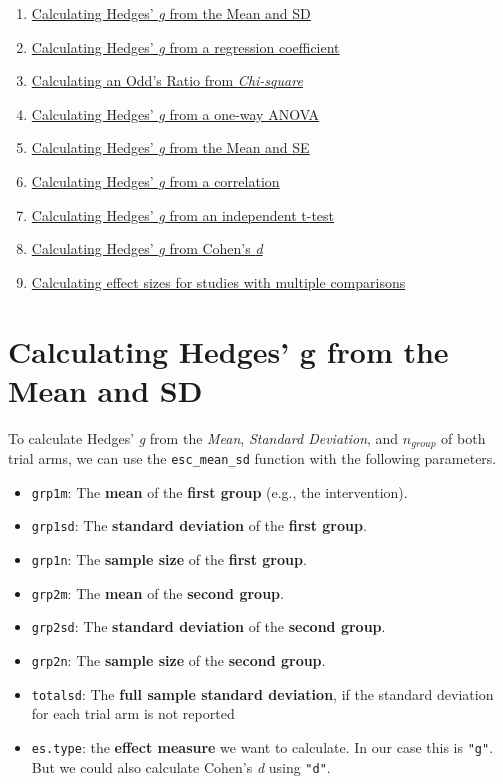 \documentclass[]{book}
\providecommand{\tightlist}{%
  \setlength{\itemsep}{0pt}\setlength{\parskip}{0pt}}
\begin{document}
\begin{enumerate}
\def\labelenumi{\arabic{enumi}.}
\tightlist
\item
  \protect\hyperlink{a}{Calculating Hedges' \emph{g} from the Mean and SD}
\item
  \protect\hyperlink{b}{Calculating Hedges' \emph{g} from a regression coefficient}
\item
  \protect\hyperlink{c}{Calculating an Odd's Ratio from \emph{Chi-square}}
\item
  \protect\hyperlink{d}{Calculating Hedges' \emph{g} from a one-way ANOVA}
\item
  \protect\hyperlink{e}{Calculating Hedges' \emph{g} from the Mean and SE}
\item
  \protect\hyperlink{f}{Calculating Hedges' \emph{g} from a correlation}
\item
  \protect\hyperlink{g}{Calculating Hedges' \emph{g} from an independent t-test}
\item
  \protect\hyperlink{h}{Calculating Hedges' \emph{g} from Cohen's \emph{d}}
\item
  \protect\hyperlink{i}{Calculating effect sizes for studies with multiple comparisons}
\end{enumerate}

\hypertarget{a}{%
\section{Calculating Hedges' g from the Mean and SD}\label{a}}

To calculate Hedges' \emph{g} from the \emph{Mean}, \emph{Standard Deviation}, and \(n_{group}\) of both trial arms, we can use the \texttt{esc\_mean\_sd} function with the following parameters.

\begin{itemize}
\tightlist
\item
  \texttt{grp1m}: The \textbf{mean} of the \textbf{first group} (e.g., the intervention).
\item
  \texttt{grp1sd}: The \textbf{standard deviation} of the \textbf{first group}.
\item
  \texttt{grp1n}: The \textbf{sample size} of the \textbf{first group}.
\item
  \texttt{grp2m}: The \textbf{mean} of the \textbf{second group}.
\item
  \texttt{grp2sd}: The \textbf{standard deviation} of the \textbf{second group}.
\item
  \texttt{grp2n}: The \textbf{sample size} of the \textbf{second group}.
\item
  \texttt{totalsd}: The \textbf{full sample standard deviation}, if the standard deviation for each trial arm is not reported
\item
  \texttt{es.type}: the \textbf{effect measure} we want to calculate. In our case this is \texttt{"g"}. But we could also calculate Cohen's \emph{d} using \texttt{"d"}.
\end{itemize}
\end{document}

